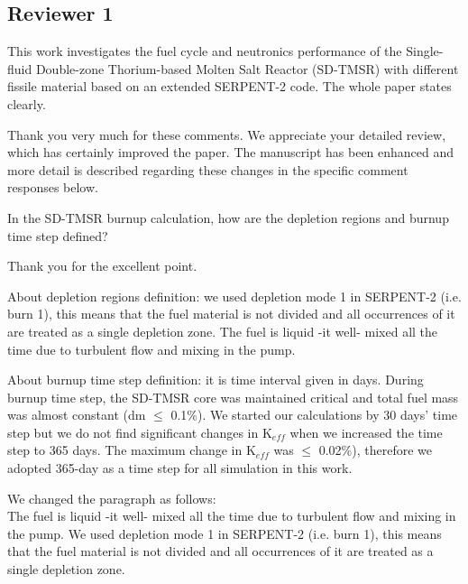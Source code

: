 \documentclass[answers,11pt]{exam}
\begin{document}
\begin{questions}
        \section*{Reviewer 1}

        \question This work investigates the fuel cycle and neutronics performance of the Single-fluid Double-zone Thorium-based Molten Salt Reactor (SD-TMSR) with different fissile material based on an extended SERPENT-2 code. The whole paper states clearly.

        \begin{solution}
                Thank you very much for these comments. We appreciate your detailed review, which has certainly improved the paper. The manuscript has been enhanced and more detail is described regarding these changes in the specific comment responses below.
        \end{solution}


        \question In the SD-TMSR burnup calculation, how are the depletion regions and burnup time step defined?
        \begin{solution}
        		  
        		  Thank you for the excellent point.
        		  
        		  About depletion regions definition: we used depletion mode 1 in SERPENT-2 (i.e. burn 1), this means that the fuel material is not divided and all occurrences of it are treated as a single depletion zone. The fuel is liquid -it well- mixed all the time due to turbulent flow and mixing in the pump.
        		  
        		  About burnup time step definition: it is time interval given in days. During burnup time step, the SD-TMSR core was maintained critical and total fuel mass was almost constant (dm $\leq$ 0.1\%). We started our calculations by 30 days' time step but we do not find significant changes in K$_{eff}$ when we increased the time step to 365 days. The maximum change in K$_{eff}$ was $\leq$ 0.02\%), therefore we adopted 365-day as a time step for all simulation in this work.
        		
        		  We changed the paragraph as follows:\\
        		  The fuel is liquid -it well- mixed all the time due to turbulent flow and mixing in the pump. We used depletion mode 1 in SERPENT-2 (i.e. burn 1), this means that the fuel material is not divided and all occurrences of it are treated as a single depletion zone.
        		  

\end{solution}
\end{questions}
\end{document}
